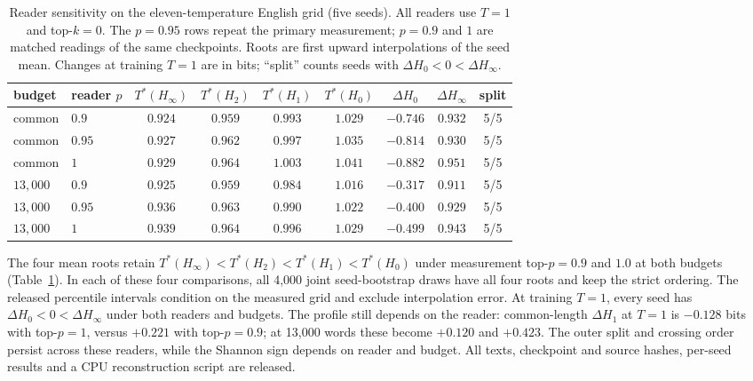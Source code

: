 \documentclass[10pt]{article}
\theoremstyle{plain}
\theoremstyle{definition}
\newcommand{\Htwo}{H_2}
\newcommand{\Hz}{H_0}
\newcommand{\Hinf}{H_\infty}
\begin{document}
\begin{table}[ht]
\centering\small
\setlength{\tabcolsep}{4pt}
\caption{Reader sensitivity on the eleven-temperature English grid (five seeds).
All readers use $T=1$ and top-$k=0$. The $p=0.95$ rows repeat the
primary measurement; $p=0.9$ and $1$ are matched readings of the same checkpoints. Roots are
first upward interpolations of the seed mean. Changes at training $T=1$ are in bits;
``split'' counts seeds with $\Delta\Hz<0<\Delta\Hinf$.}
\label{tab:readers}
\begin{tabular}{llccccccc}
\toprule
budget & reader $p$ & $T^\ast(\Hinf)$ & $T^\ast(\Htwo)$ & $T^\ast(H_1)$ & $T^\ast(\Hz)$ & $\Delta\Hz$ & $\Delta\Hinf$ & split \\
\midrule
common & $0.9$ & $0.924$ & $0.959$ & $0.993$ & $1.029$ & $-0.746$ & $0.932$ & 5/5 \\
common & $0.95$ & $0.927$ & $0.962$ & $0.997$ & $1.035$ & $-0.814$ & $0.930$ & 5/5 \\
common & $1$ & $0.929$ & $0.964$ & $1.003$ & $1.041$ & $-0.882$ & $0.951$ & 5/5 \\
\midrule
$13{,}000$ & $0.9$ & $0.925$ & $0.959$ & $0.984$ & $1.016$ & $-0.317$ & $0.911$ & 5/5 \\
$13{,}000$ & $0.95$ & $0.936$ & $0.963$ & $0.990$ & $1.022$ & $-0.400$ & $0.929$ & 5/5 \\
$13{,}000$ & $1$ & $0.939$ & $0.964$ & $0.996$ & $1.029$ & $-0.499$ & $0.943$ & 5/5 \\
\bottomrule
\end{tabular}
\end{table}

The four mean roots retain $T^\ast(\Hinf)<T^\ast(\Htwo)<T^\ast(H_1)<T^\ast(\Hz)$
under measurement top-$p=0.9$ and $1.0$ at both budgets (Table~\ref{tab:readers}). In each of these four comparisons,
all 4,000 joint seed-bootstrap draws have all four roots and keep the strict ordering.
The released percentile intervals condition on the measured grid and exclude interpolation error.
At training $T=1$, every seed has $\Delta\Hz<0<\Delta\Hinf$ under both readers and budgets.
The profile still depends on the reader: common-length $\Delta H_1$ at $T=1$ is $-0.128$ bits
with top-$p=1$, versus $+0.221$ with top-$p=0.9$; at 13,000 words these become $+0.120$ and
$+0.423$. The outer split and crossing order persist across these readers, while the
Shannon sign depends on reader and budget.
All texts, checkpoint and source hashes, per-seed results and a CPU reconstruction script are released.
\end{document}
